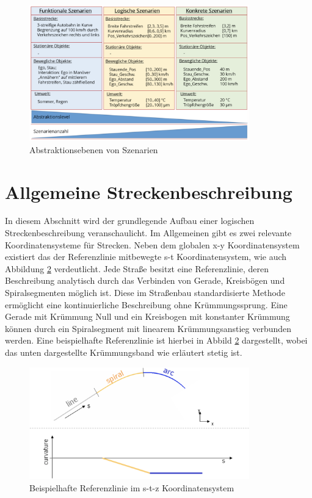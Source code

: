 \begin{figure}[!h]
\flushleft
\center \includegraphics[width=0.85\textwidth]{fig/fig1b.png}
\caption{Abstraktionsebenen von Szenarien \cite{Szenarienbeschreibung.2019}}
\label{abb1b}
\end{figure}

\section{Allgemeine Streckenbeschreibung}
In diesem Abschnitt wird der grundlegende Aufbau einer logischen Streckenbeschreibung veranschaulicht. Im Allgemeinen gibt es zwei relevante Koordinatensysteme für Strecken. Neben dem globalen x-y Koordinatensystem existiert das der Referenzlinie mitbewegte s-t Koordinatensystem, wie auch Abbildung \ref{abb2} verdeutlicht. Jede Straße besitzt eine Referenzlinie, deren Beschreibung analytisch durch das Verbinden von Gerade, Kreisbögen und Spiralsegmenten möglich ist. Diese im Straßenbau standardisierte Methode ermöglicht eine kontinuierliche Beschreibung ohne Krümmungssprung. Eine Gerade mit Krümmung Null und ein Kreisbogen mit konstanter Krümmung können durch ein Spiralsegment mit linearem Krümmungsanstieg verbunden werden. Eine beispielhafte Referenzlinie ist hierbei in Abbild \ref{abb2} dargestellt, wobei das unten dargestellte Krümmungsband wie erläutert stetig ist.

\begin{figure}[!h]
\flushleft
\center \includegraphics[width=0.85\textwidth]{fig/fig2.png}
\caption{Beispielhafte Referenzlinie im s-t-z Koordinatensystem \cite{Becker.2017}}
\label{abb2}
\end{figure}

